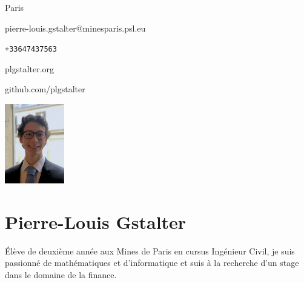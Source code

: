 \documentclass{article}
\begin{document}
\begin{multicols}{3}

Paris

pierre-louis.gstalter@minesparis.psl.eu

\texttt{+33647437563}

plgstalter.org

github.com/plgstalter

\columnbreak

	\hfill\includegraphics[width=2.6cm]{photo.jpeg}

\columnbreak

{\color{blue} \section*{Pierre-Louis Gstalter}}

\noindent Élève de deuxième année aux Mines de Paris en cursus Ingénieur Civil, je suis passionné de mathématiques et d'informatique et suis à la recherche d'un stage dans le domaine de la finance.
\end{multicols}
\end{document}
